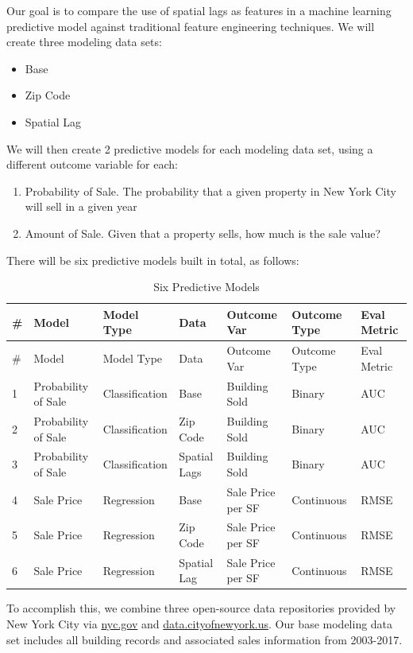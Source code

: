 \documentclass[12pt,]{article}
\providecommand{\tightlist}{%
  \setlength{\itemsep}{0pt}\setlength{\parskip}{0pt}}
\begin{document}
Our goal is to compare the use of spatial lags as features in a machine
learning predictive model against traditional feature engineering
techniques. We will create three modeling data sets:

\begin{itemize}
\tightlist
\item
  Base
\item
  Zip Code
\item
  Spatial Lag
\end{itemize}

We will then create 2 predictive models for each modeling data set,
using a different outcome variable for each:

\begin{enumerate}
\def\labelenumi{\arabic{enumi})}
\tightlist
\item
  Probability of Sale. The probability that a given property in New York
  City will sell in a given year
\item
  Amount of Sale. Given that a property sells, how much is the sale
  value?
\end{enumerate}

There will be six predictive models built in total, as follows:

\begin{longtable}[]{@{}lllllll@{}}
\caption{Six Predictive Models}\tabularnewline
\toprule
\# & Model & Model Type & Data & Outcome Var & Outcome Type & Eval
Metric\tabularnewline
\midrule
\endfirsthead
\toprule
\# & Model & Model Type & Data & Outcome Var & Outcome Type & Eval
Metric\tabularnewline
\midrule
\endhead
1 & Probability of Sale & Classification & Base & Building Sold & Binary
& AUC\tabularnewline
2 & Probability of Sale & Classification & Zip Code & Building Sold &
Binary & AUC\tabularnewline
3 & Probability of Sale & Classification & Spatial Lags & Building Sold
& Binary & AUC\tabularnewline
4 & Sale Price & Regression & Base & Sale Price per SF & Continuous &
RMSE\tabularnewline
5 & Sale Price & Regression & Zip Code & Sale Price per SF & Continuous
& RMSE\tabularnewline
6 & Sale Price & Regression & Spatial Lag & Sale Price per SF &
Continuous & RMSE\tabularnewline
\bottomrule
\end{longtable}

To accomplish this, we combine three open-source data repositories
provided by New York City via \url{nyc.gov} and
\url{data.cityofnewyork.us}. Our base modeling data set includes all
building records and associated sales information from 2003-2017.
\end{document}
